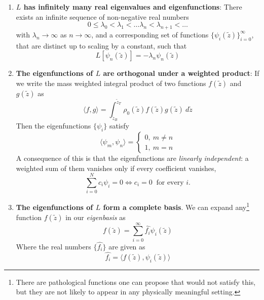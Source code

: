 \documentclass{article}
\numberwithin{equation}{section}
\newcommand{\z}{\tilde{z}}
\begin{document}
\begin{enumerate}
  \item \textbf{$L$ has infinitely many real eigenvalues and eigenfunctions}: There exists an infinite sequence of non-negative real numbers
\begin{equation}
  0\leq\lambda_0<\lambda_1<\dots\lambda_n<\lambda_{n+1}<\dots
\end{equation}
with $\lambda_n\to\infty$ as $n\to\infty$, and a corresponding set of functions $\{\psi_i(\z)\}_{i=0}^\infty$, that are distinct up to scaling by a constant, such that
\begin{equation}
  L[\psi_n(\z)] = -\lambda_n\psi_n(\z)
\end{equation}
  \item \textbf{The eigenfunctions of $L$ are orthogonal under a weighted product}: If we write the mass weighted integral product of two functions $f(\z)$ and $g(\z)$ as 
\begin{equation}
  \label{eq:inner_product_def}
  \langle f, g\rangle = \int_{\z_B}^{\z_T}\rho_0(\z)f(\z)g(\z)\ d\z
\end{equation}
Then the eigenfunctions $\{\psi_i\}$ satisfy
\begin{equation}
  \label{eq:orthogonality}
  \langle\psi_m, \psi_n\rangle =
  \begin{cases}
    0 ,\ m\neq n \\
    1 ,\ m=n
  \end{cases}
\end{equation}
%
A consequence of this is that the eigenfunctions are \textit{linearly
independent}: a weighted sum of them vanishes only if every coefficient
vanishes,
\begin{equation}
\label{eq:lin_indep}
\sum_{i=0}^{N}c_i\psi_i=0
\iff
c_i=0 \ \text{ for every } i.
\end{equation}
%
\item \textbf{The eigenfunctions of $L$ form a complete basis}. We can expand any\footnote{There are pathological functions one can propose that would not satisfy this, but they are not likely to appear in any physically meaningful setting.}
%
function $f(\z)$ in our \textit{eigenbasis} as 
\begin{equation}
  f(\z) = \sum_{i=0}^{\infty}\hat{f_i}\psi_i(\z)
\end{equation}
Where the real numbers $\{\hat{f_i}\}$ are given as 
\begin{equation}
  \hat{f_i} = \langle f(\z), \psi_i(\z)\rangle
\end{equation}
\end{enumerate}
\end{document}
